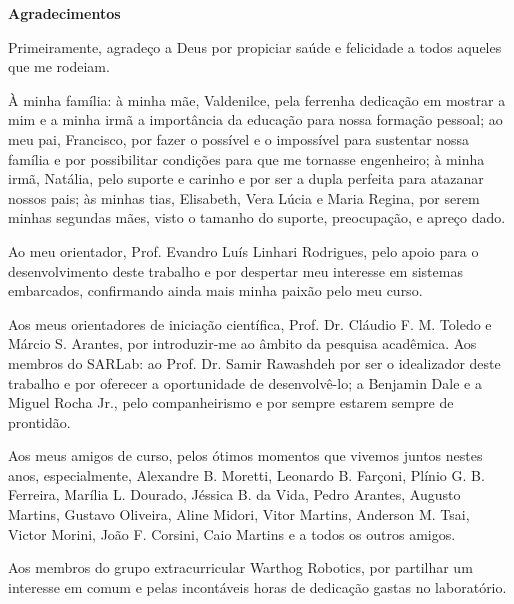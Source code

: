 \cleardoublepage

\vspace{0.11\textheight} 

\begin{center}
\textbf{\Huge{Agradecimentos}}
\end{center}

\vspace{0.05\textheight}

Primeiramente, agradeço a Deus por propiciar saúde e felicidade a todos aqueles que me rodeiam.

À minha família: à minha mãe, Valdenilce, pela ferrenha dedicação em mostrar a mim e a minha irmã a importância da educação para nossa formação pessoal; ao meu pai, Francisco, por fazer o possível e o impossível para sustentar nossa família e por possibilitar condições para que me tornasse engenheiro; à minha irmã, Natália, pelo suporte e carinho e por ser a dupla perfeita para atazanar nossos pais; às minhas tias, Elisabeth, Vera Lúcia e Maria Regina, por serem minhas segundas mães, visto o tamanho do suporte, preocupação, e apreço dado. 

Ao meu orientador, Prof. Evandro Luís Linhari Rodrigues, pelo apoio para o desenvolvimento deste trabalho e por despertar meu interesse em sistemas embarcados, confirmando ainda mais minha paixão pelo meu curso.  

Aos meus orientadores de iniciação científica, Prof. Dr. Cláudio F. M. Toledo e Márcio S. Arantes, por introduzir-me ao âmbito da pesquisa acadêmica. Aos membros do SARLab: ao Prof. Dr. Samir Rawashdeh por ser o idealizador deste trabalho e por oferecer a oportunidade de desenvolvê-lo; a Benjamin Dale e a Miguel Rocha Jr., pelo companheirismo e por sempre estarem sempre de prontidão.

Aos meus amigos de curso, pelos ótimos momentos que vivemos juntos nestes anos, especialmente, Alexandre B. Moretti, Leonardo B. Farçoni, Plínio G. B. Ferreira, Marília L. Dourado,  Jéssica B. da Vida, Pedro Arantes, Augusto Martins, Gustavo Oliveira, Aline Midori, Vitor Martins, Anderson M. Tsai, Victor Morini, João F. Corsini, Caio Martins e a todos os outros amigos. 

Aos membros do grupo extracurricular Warthog Robotics, por partilhar um interesse em comum e pelas incontáveis horas de dedicação gastas no laboratório.

